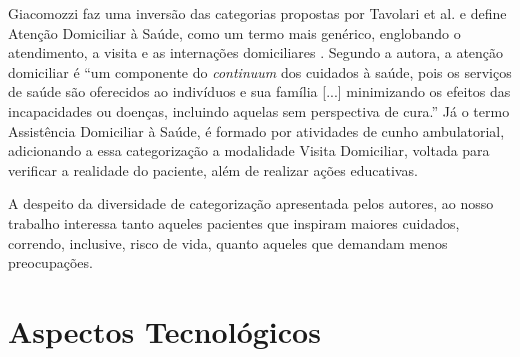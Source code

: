 

Giacomozzi faz uma inversão das categorias propostas por Tavolari et al. e 
define Atenção Domiciliar à Saúde, como um termo mais genérico, englobando
o atendimento, a visita e as internações domiciliares \cite{giacomozzi2006pratica}.
Segundo a autora, a atenção domiciliar é ``um
componente do \textit{continuum} dos cuidados à saúde, pois os serviços de
saúde são oferecidos ao indivíduos e sua família [...] minimizando os efeitos
das incapacidades ou doenças, incluindo aquelas sem perspectiva de cura.''
Já o termo Assistência Domiciliar à Saúde, é formado por atividades de cunho 
ambulatorial, adicionando a essa categorização a modalidade Visita Domiciliar,
voltada para verificar a realidade do paciente, além de realizar ações educativas.  

A despeito da diversidade de categorização apresentada pelos autores, ao nosso
trabalho interessa tanto aqueles pacientes que inspiram maiores cuidados,
correndo, inclusive, risco de vida, quanto aqueles que demandam menos
preocupações.



\section{Aspectos Tecnológicos}\label{sec:aspectos-tecnologicos}
